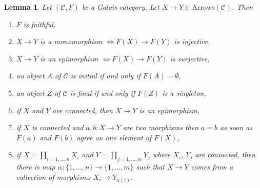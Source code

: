 \documentclass{stacks-project}
\theoremstyle{plain}
\newtheorem{lemma}[subsection]{Lemma}
\theoremstyle{definition}
\theoremstyle{remark}
\numberwithin{equation}{subsection}
\begin{document}
\begin{lemma}
\label{lemma-epi-mono}
Let $(\mathcal{C}, F)$ be a Galois category. Let
$X \to Y \in \text{Arrows}(\mathcal{C})$. Then
\begin{enumerate}
\item $F$ is faithful,
\item $X \to Y$ is a monomorphism
$\Leftrightarrow F(X) \to F(Y)$ is injective,
\item $X \to Y$ is an epimorphism
$\Leftrightarrow F(X) \to F(Y)$ is surjective,
\item an object $A$ of $\mathcal{C}$ is initial if and only if
$F(A) = \emptyset$,
\item an object $Z$ of $\mathcal{C}$ is final if and only if
$F(Z)$ is a singleton,
\item if $X$ and $Y$ are connected, then $X \to Y$ is an epimorphism,
\item
\label{item-one-element}
if $X$ is connected and $a, b : X \to Y$ are two morphisms
then $a = b$ as soon as $F(a)$ and $F(b)$ agree on one element of $F(X)$,
\item if $X = \coprod_{i = 1, \ldots, n} X_i$ and
$Y = \coprod_{j = 1, \ldots, m} Y_j$ where $X_i$, $Y_j$ are connected,
then there is map $\alpha : \{1, \ldots, n\} \to \{1, \ldots, m\}$
such that $X \to Y$ comes from a collection of morphisms
$X_i \to Y_{\alpha(i)}$.
\end{enumerate}
\end{lemma}
\end{document}
